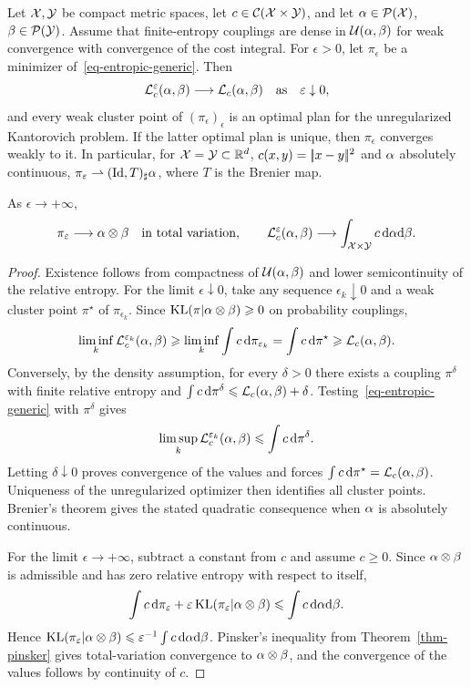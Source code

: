 \begin{prop}\label{prop-continuous-convergence-epsilon}
	Let $\mathcal{X},\mathcal{Y}$ be compact metric spaces, let $c\in\mathcal{C}(\mathcal{X}\times\mathcal{Y})$, and let $\alpha\in\mathcal{P}(\mathcal{X})$, $\beta\in\mathcal{P}(\mathcal{Y})$. Assume that finite-entropy couplings are dense in $\mathcal{U}(\alpha,\beta)$ for weak convergence with convergence of the cost integral. For $\epsilon>0$, let $\pi_\epsilon$ be a minimizer of~\eqref{eq-entropic-generic}. Then
	\[
		\mathcal{L}_c^\varepsilon(\alpha,\beta)\longrightarrow \mathcal{L}_c(\alpha,\beta)
		\quad\text{as}\quad \varepsilon\downarrow0,
	\]
	and every weak cluster point of $(\pi_\epsilon)_\epsilon$ is an optimal plan for the unregularized Kantorovich problem. If the latter optimal plan is unique, then $\pi_\epsilon$ converges weakly to it. In particular, for $\mathcal{X}=\mathcal{Y}\subset\mathbb{R}^d$, $c(x,y)=|\!| x-y |\!|^2$ and $\alpha$ absolutely continuous, $\pi_\varepsilon\rightharpoonup(\mathrm{Id},T)_\sharp\alpha$, where $T$ is the Brenier map.

	As $\epsilon\to+\infty$,
	\[
		\pi_\varepsilon\longrightarrow \alpha\otimes\beta
		\quad\text{in total variation},\qquad
		\mathcal{L}_c^\varepsilon(\alpha,\beta)\longrightarrow \int_{\mathcal{X}\times\mathcal{Y}} c\,\mathrm{d}\alpha\mathrm{d}\beta.
	\]
\end{prop}

\begin{proof}
	Existence follows from compactness of $\mathcal{U}(\alpha,\beta)$ and lower semicontinuity of the relative entropy. For the limit $\epsilon\downarrow0$, take any sequence $\epsilon_k\downarrow0$ and a weak cluster point $\pi^\star$ of $\pi_{\epsilon_k}$. Since $\operatorname{KL}(\pi|\alpha\otimes\beta)\geqslant0$ on probability couplings,
	\[
		\liminf_k \mathcal{L}_c^{\varepsilon_k}(\alpha,\beta)
		\geqslant \liminf_k \int c\,\mathrm{d}\pi_{\varepsilon_k}
		= \int c\,\mathrm{d}\pi^\star
		\geqslant \mathcal{L}_c(\alpha,\beta).
	\]
	Conversely, by the density assumption, for every $\delta>0$ there exists a coupling $\pi^\delta$ with finite relative entropy and $\int c\,\mathrm{d}\pi^\delta\leqslant \mathcal{L}_c(\alpha,\beta)+\delta$. Testing~\eqref{eq-entropic-generic} with $\pi^\delta$ gives
	\[
		\limsup_k \mathcal{L}_c^{\varepsilon_k}(\alpha,\beta)
		\leqslant \int c\,\mathrm{d}\pi^\delta.
	\]
	Letting $\delta\downarrow0$ proves convergence of the values and forces $\int c\,\mathrm{d}\pi^\star=\mathcal{L}_c(\alpha,\beta)$. Uniqueness of the unregularized optimizer then identifies all cluster points. Brenier's theorem gives the stated quadratic consequence when $\alpha$ is absolutely continuous.

	For the limit $\epsilon\to+\infty$, subtract a constant from $c$ and assume $c\geq0$. Since $\alpha\otimes\beta$ is admissible and has zero relative entropy with respect to itself,
	\[
		\int c\,\mathrm{d}\pi_\varepsilon+\varepsilon\operatorname{KL}(\pi_\varepsilon|\alpha\otimes\beta)
		\leqslant
		\int c\,\mathrm{d}\alpha\mathrm{d}\beta.
	\]
	Hence $\operatorname{KL}(\pi_\varepsilon|\alpha\otimes\beta)\leqslant \varepsilon^{-1}\int c\,\mathrm{d}\alpha\mathrm{d}\beta$. Pinsker's inequality from Theorem~\ref{thm-pinsker} gives total-variation convergence to $\alpha\otimes\beta$, and the convergence of the values follows by continuity of $c$.
\end{proof}

